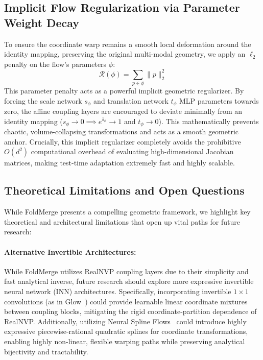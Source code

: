 \subsection{Implicit Flow Regularization via Parameter Weight Decay}
To ensure the coordinate warp remains a smooth local deformation around the identity mapping, preserving the original multi-modal geometry, we apply an $\ell_2$ penalty on the flow's parameters $\phi$:
\begin{equation}
  \mathcal{R}(\phi) = \sum_{p \in \phi} \|p\|_2^2
\end{equation}
This parameter penalty acts as a powerful implicit geometric regularizer. 
By forcing the scale network $s_\phi$ and translation network $t_\phi$ MLP parameters towards zero, the affine coupling layers are encouraged to deviate minimally from an identity mapping ($s_\phi \to 0 \implies e^{\bar{s}_\phi} \to 1$ and $t_\phi \to 0$). 
This mathematically prevents chaotic, volume-collapsing transformations and acts as a smooth geometric anchor. 
Crucially, this implicit regularizer completely avoids the prohibitive $O(d^2)$ computational overhead of evaluating high-dimensional Jacobian matrices, making test-time adaptation extremely fast and highly scalable.

\subsection{Theoretical Limitations and Open Questions}
While FoldMerge presents a compelling geometric framework, we highlight key theoretical and architectural limitations that open up vital paths for future research:

\paragraph{Alternative Invertible Architectures:}
While FoldMerge utilizes RealNVP coupling layers due to their simplicity and fast analytical inverse, future research should explore more expressive invertible neural network (INN) architectures. Specifically, incorporating invertible $1\times 1$ convolutions (as in Glow~\cite{kingma2018glow}) could provide learnable linear coordinate mixtures between coupling blocks, mitigating the rigid coordinate-partition dependence of RealNVP. Additionally, utilizing Neural Spline Flows~\cite{durkan2019neural} could introduce highly expressive piecewise-rational quadratic splines for coordinate transformations, enabling highly non-linear, flexible warping paths while preserving analytical bijectivity and tractability.

